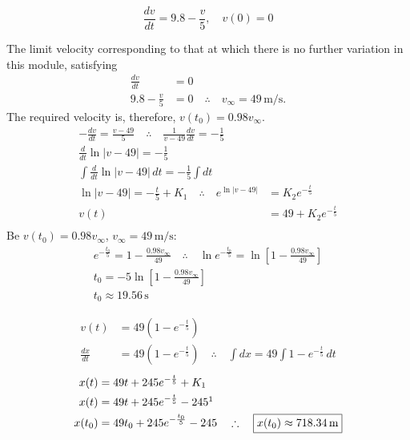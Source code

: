 \begin{solution}
	$$\frac{dv}{dt}=9.8-\frac{v}{5}, \quad v(0)=0$$
	\begin{solparts}
		\item
		The limit velocity corresponding to that at which there is no  further variation in this module, satisfying
		\begin{align*}
			\frac{dv}{dt}&=0\\
			9.8-\frac{v}{5}&=0 \quad \therefore \quad v_{\infty}=49\,\text{m/s}.
		\end{align*}
		The required velocity is, therefore, $v(t_0)=0.98v_{\infty}$.
		\begin{align*}
			-\frac{dv}{dt}=\frac{v-49}{5} \quad \therefore \quad \frac{1}{v-49}\frac{dv}{dt}=-\frac{1}{5}\\
			\frac{d}{dt}\ln|v-49|=-\frac{1}{5}\\
			\int \frac{d}{dt}\ln|v-49|\, dt=-\frac{1}{5}\int dt\\
			\ln|v-49|=-\frac{t}{5}+K_1 \quad \therefore \quad e^{\ln|v-49|}&=K_2e^{-\frac{t}{5}}\\
			v(t)&=49+K_2e^{-\frac{t}{5}}\\
		\end{align*}
		Be $v(t_0)=0.98v_{\infty}$, $v_{\infty}=49\,\text{m/s}$:
		\begin{gather*}
			e^{-\frac{t_0}{5}}=1-\frac{0.98v_{\infty}}{49} \quad \therefore \quad \ln e^{-\frac{t_0}{5}}=\ln \left[1-\frac{0.98v_{\infty}}{49}\right]\\
			t_0=-5\ln \left[1-\frac{0.98v_{\infty}}{49}\right]\\
			\boxed{t_0\approx 19.56\, \text{s}}
		\end{gather*}
		
		\item 
		\begin{align*}
			v(t)&=49(1-e^{-\frac{t}{5}})\\
			\frac{dx}{dt}&=49(1-e^{-\frac{t}{5}})\quad \therefore \quad \int dx=49\int 1-e^{-\frac{t}{5}}\, dt
		\end{align*}
		\begin{align*}
			x(t)&=49t+245e^{-\frac{t}{5}}+K_1\\
			x(t)&=49t+245e^{-\frac{t}{5}}-245\footnotemark\\
			x(t_0)&=49t_0+245e^{-\frac{t_0}{5}}-245\quad \therefore \quad \boxed{x(t_0)\approx 718.34\, \text{m}}
		\end{align*}
	\end{solparts}
\end{solution}

